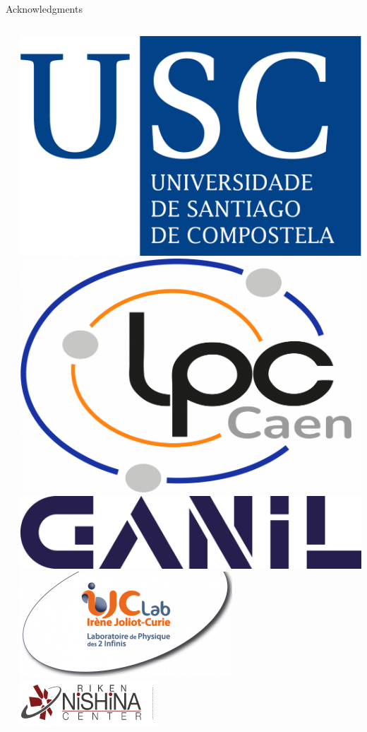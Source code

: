 \documentclass[aspectratio=43, dvipsnames]{beamer}
\begin{document}
\begin{frame}[plain]{Acknowledgments}
\begin{columns}[T]
\begin{column}{0.33\linewidth}
        \end{column}
        \begin{column}{0.33\linewidth}
            \includegraphics[width=0.6\linewidth]{logos/usc_blue.png}\vspace{1em}
            \includegraphics[width=0.6\linewidth]{logos/lpc.png}\vspace{1em}
            \includegraphics[width=0.6\linewidth]{logos/ganil.png}\vspace{1em}
            \includegraphics[width=0.6\linewidth]{logos/ijclab.png}\vspace{1em}
            \includegraphics[width=0.6\linewidth]{logos/riken.png}\vspace{1em}

\end{column}
\end{columns}
\end{frame}
\end{document}
